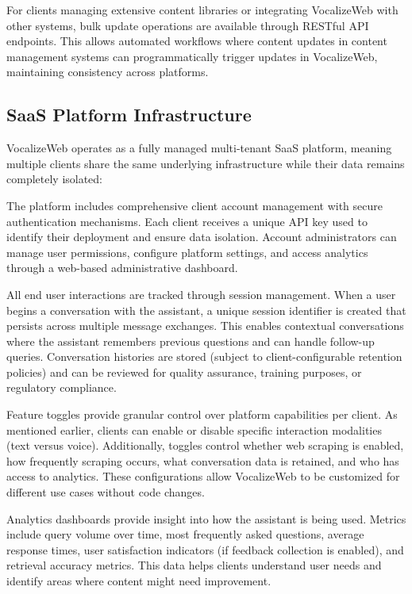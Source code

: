 For clients managing extensive content libraries or integrating VocalizeWeb with other systems, bulk update operations are available through RESTful API endpoints. This allows automated workflows where content updates in content management systems can programmatically trigger updates in VocalizeWeb, maintaining consistency across platforms.

\subsection{SaaS Platform Infrastructure}

VocalizeWeb operates as a fully managed multi-tenant SaaS platform, meaning multiple clients share the same underlying infrastructure while their data remains completely isolated:

The platform includes comprehensive client account management with secure authentication mechanisms. Each client receives a unique API key used to identify their deployment and ensure data isolation. Account administrators can manage user permissions, configure platform settings, and access analytics through a web-based administrative dashboard.

All end user interactions are tracked through session management. When a user begins a conversation with the assistant, a unique session identifier is created that persists across multiple message exchanges. This enables contextual conversations where the assistant remembers previous questions and can handle follow-up queries. Conversation histories are stored (subject to client-configurable retention policies) and can be reviewed for quality assurance, training purposes, or regulatory compliance.

Feature toggles provide granular control over platform capabilities per client. As mentioned earlier, clients can enable or disable specific interaction modalities (text versus voice). Additionally, toggles control whether web scraping is enabled, how frequently scraping occurs, what conversation data is retained, and who has access to analytics. These configurations allow VocalizeWeb to be customized for different use cases without code changes.

Analytics dashboards provide insight into how the assistant is being used. Metrics include query volume over time, most frequently asked questions, average response times, user satisfaction indicators (if feedback collection is enabled), and retrieval accuracy metrics. This data helps clients understand user needs and identify areas where content might need improvement.

